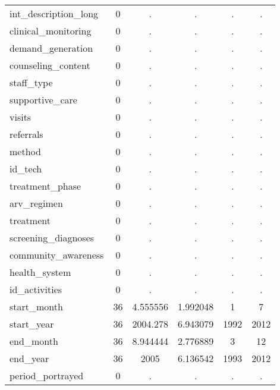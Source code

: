 \begin{table}[htbp]
\begin{tabular}{l*{1}{ccccc}}
int\_description\_long&           0&           .&           .&           .&           .\\
clinical\_monitoring&           0&           .&           .&           .&           .\\
demand\_generation&           0&           .&           .&           .&           .\\
counseling\_content&           0&           .&           .&           .&           .\\
staff\_type  &           0&           .&           .&           .&           .\\
supportive\_care&           0&           .&           .&           .&           .\\
visits      &           0&           .&           .&           .&           .\\
referrals   &           0&           .&           .&           .&           .\\
method      &           0&           .&           .&           .&           .\\
id\_tech     &           0&           .&           .&           .&           .\\
treatment\_phase&           0&           .&           .&           .&           .\\
arv\_regimen &           0&           .&           .&           .&           .\\
treatment   &           0&           .&           .&           .&           .\\
screening\_diagnoses&           0&           .&           .&           .&           .\\
community\_awareness&           0&           .&           .&           .&           .\\
health\_system&           0&           .&           .&           .&           .\\
id\_activities&           0&           .&           .&           .&           .\\
start\_month &          36&    4.555556&    1.992048&           1&           7\\
start\_year  &          36&    2004.278&    6.943079&        1992&        2012\\
end\_month   &          36&    8.944444&    2.776889&           3&          12\\
end\_year    &          36&        2005&    6.136542&        1993&        2012\\
period\_portrayed&           0&           .&           .&           .&           .\\

\end{tabular}
\end{table}
